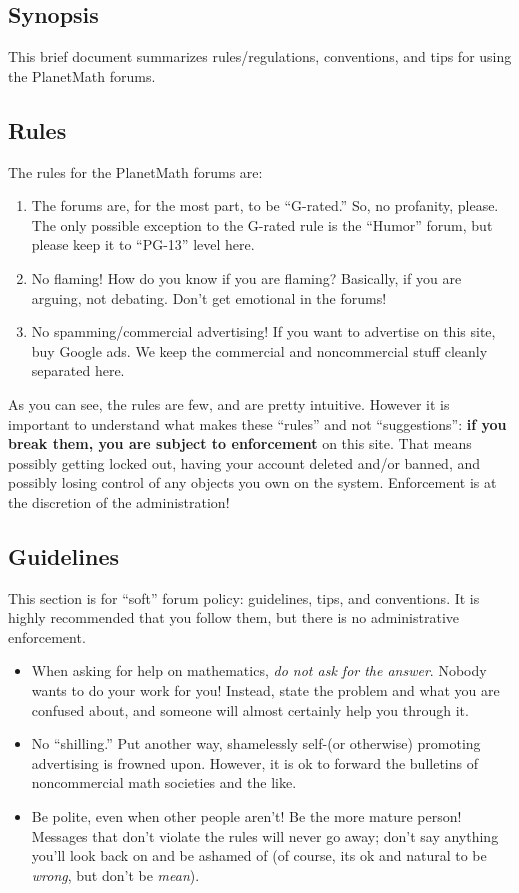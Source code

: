 \subsection*{Synopsis}

This brief document summarizes rules/regulations, conventions, and tips for using the PlanetMath forums.

\subsection*{Rules}

The rules for the PlanetMath forums are:

\begin{enumerate}
\item The forums are, for the most part, to be ``G-rated.'' So, no profanity, please. The only possible exception to the G-rated rule is the ``Humor'' forum, but please keep it to ``PG-13'' level here.
\item No flaming! How do you know if you are flaming? Basically, if you are arguing, not debating. Don't get emotional in the forums!
\item No spamming/commercial advertising! If you want to advertise on this site, buy Google ads. We keep the commercial and noncommercial stuff cleanly separated here.
\end{enumerate}

As you can see, the rules are few, and are pretty intuitive. However it is important to understand what makes these ``rules'' and not ``suggestions'': \textbf{if you break them, you are subject to enforcement} on this site. That means possibly getting locked out, having your account deleted and/or banned, and possibly losing control of any objects you own on the system. Enforcement is at the discretion of the administration!

\subsection*{Guidelines}

This section is for ``soft'' forum policy: guidelines, tips, and conventions. It is highly recommended that you follow them, but there is no administrative enforcement.

\begin{itemize}
\item When asking for help on mathematics, \emph{do not ask for the answer}. Nobody wants to do your work for you! Instead, state the problem and what you are confused about, and someone will almost certainly help you through it.
\item No ``shilling.'' Put another way, shamelessly self-(or otherwise) promoting advertising is frowned upon. However, it is ok to forward the bulletins of noncommercial math societies and the like.
\item Be polite, even when other people aren't! Be the more mature person! Messages that don't violate the rules will never go away; don't say anything you'll look back on and be ashamed of (of course, its ok and natural to be \emph{wrong}, but don't be \emph{mean}).
\end{itemize}


